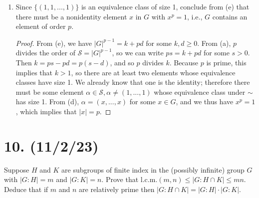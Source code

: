 \documentclass{article}
\begin{document}
\begin{enumerate}[label=(\alph*), itemsep=0em, start=2]
\begin{proof}
            The equivalence classes of the elements of $\mathcal{S}$ partition $\mathcal{S}$. Suppose there are $k$ equivalence classes of order 1, and $d$ equivalence classes of order $p$. From (a), the order of $\mathcal{S}$ is $|G|^{p - 1}$. Then we have $|G|^{p - 1} = k + pd$.
          \end{proof}
    \item Since $\{ (1, 1, ..., 1) \}$ is an equivalence class of size 1, conclude from (e) that there must be a nonidentity element $x$ in $G$ with $x^p = 1$, i.e., $G$ contains an element of order $p$.
          \begin{proof}
            From (e), we have $|G|^{p - 1} = k + pd$ for some $k, d \geq 0$. From (a), $p$ divides the order of $\mathcal{S} = |G|^{p - 1}$, so we can write $ps = k + pd$ for some $s > 0$. Then $k = ps - pd = p(s - d)$, and so $p$ divides $k$. Because $p$ is prime, this implies that $k > 1$, so there are at least two elements whose equivalence classes have size 1. We already know that one is the identity; therefore there must be some element $\alpha \in \mathcal{S}, \alpha \neq (1, ..., 1)$ whose equivalence class under $\sim$ has size 1. From (d), $\alpha = (x, ..., x)$ for some $x \in G$, and we thus have $x^p = 1$, which implies that $|x| = p$.
          \end{proof}
\end{enumerate}

\section*{10. (11/2/23)}

Suppose $H$ and $K$ are subgroups of finite index in the (possibly infinite) group $G$ with $|G : H| = m$ and $|G : K| = n$. Prove that l.c.m.$(m, n) \leq |G : H \cap K| \leq mn$. Deduce that if $m$ and $n$ are relatively prime then $|G : H \cap K| = |G : H| \cdot |G : K|$.
\end{document}
